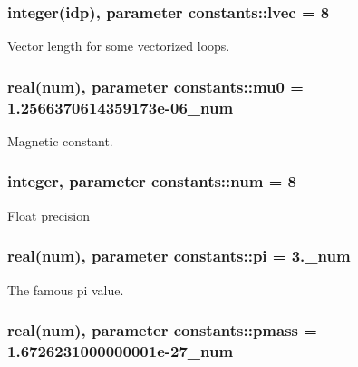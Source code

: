 \subsubsection[{\texorpdfstring{lvec}{lvec}}]{\setlength{\rightskip}{0pt plus 5cm}integer({\bf idp}), parameter constants\+::lvec = 8}\hypertarget{namespaceconstants_a68354913203e3e01c9b0b547e9d95aae}{}\label{namespaceconstants_a68354913203e3e01c9b0b547e9d95aae}


Vector length for some vectorized loops. 

\subsubsection[{\texorpdfstring{mu0}{mu0}}]{\setlength{\rightskip}{0pt plus 5cm}real({\bf num}), parameter constants\+::mu0 = 1.\+2566370614359173e-\/06\+\_\+num}\hypertarget{namespaceconstants_adf2453bfeefbefa1135a81f4ddfe4d6d}{}\label{namespaceconstants_adf2453bfeefbefa1135a81f4ddfe4d6d}


Magnetic constant. 

\subsubsection[{\texorpdfstring{num}{num}}]{\setlength{\rightskip}{0pt plus 5cm}integer, parameter constants\+::num = 8}\hypertarget{namespaceconstants_afe19f7f8af171411c51fb763b36e3823}{}\label{namespaceconstants_afe19f7f8af171411c51fb763b36e3823}


Float precision 

\subsubsection[{\texorpdfstring{pi}{pi}}]{\setlength{\rightskip}{0pt plus 5cm}real({\bf num}), parameter constants\+::pi = 3.\+\_\+num}\hypertarget{namespaceconstants_a736c2860cb0585043ad4abcd1c3352b1}{}\label{namespaceconstants_a736c2860cb0585043ad4abcd1c3352b1}


The famous pi value. 

\subsubsection[{\texorpdfstring{pmass}{pmass}}]{\setlength{\rightskip}{0pt plus 5cm}real({\bf num}), parameter constants\+::pmass = 1.\+6726231000000001e-\/27\+\_\+num}\hypertarget{namespaceconstants_a44f3d8cbf9c39db63d7533d985cc51c3}{}\label{namespaceconstants_a44f3d8cbf9c39db63d7533d985cc51c3}



